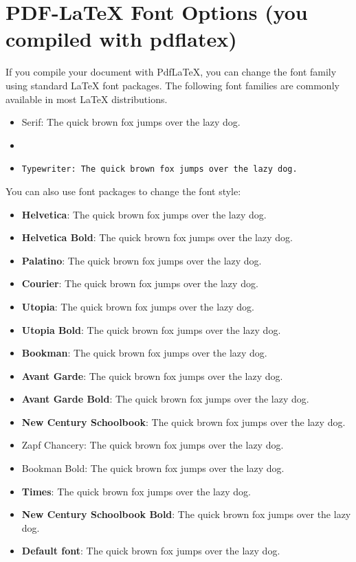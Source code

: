 
\section{PDF-\LaTeX{} Font Options (you compiled with pdflatex)}

If you compile your document with PdfLaTeX, you can change the font family using standard LaTeX font packages.
The following font families are commonly available in most LaTeX distributions.\\

\begin{itemize}[noitemsep]
    \item \rm{Serif: The quick brown fox jumps over the lazy dog.}
    \item {}
    \item \tt{Typewriter: The quick brown fox jumps over the lazy dog.}
\end{itemize}
You can also use font packages to change the font style:
\begin{itemize}[noitemsep]
    \item { \textbf{Helvetica}: The quick brown fox jumps over the lazy dog.}
    \item { \textbf{Helvetica Bold}: The quick brown fox jumps over the lazy dog.}
    \item { \textbf{Palatino}: The quick brown fox jumps over the lazy dog.}
    \item { \textbf{Courier}: The quick brown fox jumps over the lazy dog.}
    \item { \textbf{Utopia}: The quick brown fox jumps over the lazy dog.}
    \item { \textbf{Utopia Bold}: The quick brown fox jumps over the lazy dog.}
    \item { \textbf{Bookman}: The quick brown fox jumps over the lazy dog.}
    \item { \textbf{Avant Garde}: The quick brown fox jumps over the lazy dog.}
    \item { \textbf{Avant Garde Bold}: The quick brown fox jumps over the lazy dog.}
    \item { \textbf{New Century Schoolbook}: The quick brown fox jumps over the lazy dog.}
    \item { Zapf Chancery: The quick brown fox jumps over the lazy dog.}
    \item { Bookman Bold: The quick brown fox jumps over the lazy dog.}
    \item { \textbf{Times}: The quick brown fox jumps over the lazy dog.}
    \item { \textbf{New Century Schoolbook Bold}: The quick brown fox jumps over the lazy dog.}
    \item \textbf{Default font}: The quick brown fox jumps over the lazy dog.
\end{itemize}


